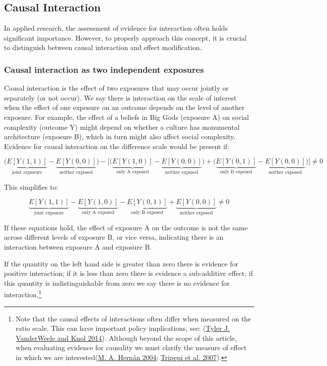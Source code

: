 \documentclass[
  singlecolumn]{report}
\begin{document}
\hypertarget{causal-interaction}{%
\subsection{Causal Interaction}\label{causal-interaction}}

In applied research, the assessment of evidence for interaction often
holds significant importance. However, to properly approach this
concept, it is crucial to distinguish between causal interaction and
effect modification.

\hypertarget{causal-interaction-as-two-independent-exposures}{%
\subsubsection{\texorpdfstring{\textbf{Causal interaction as two
independent
exposures}}{Causal interaction as two independent exposures}}\label{causal-interaction-as-two-independent-exposures}}

Causal interaction is the effect of two exposures that may occur jointly
or separately (or not occur). We say there is interaction on the scale
of interest when the effect of one exposure on an outcome depends on the
level of another exposure. For example, the effect of a beliefs in Big
Gods (exposure A) on social complexity (outcome Y) might depend on
whether a culture has monumental architecture (exposure B), which in
turn might also affect social complexity. Evidence for causal
interaction on the difference scale would be present if:

\[\bigg(\underbrace{E[Y(1,1)]}_{\text{joint exposure}} - \underbrace{E[Y(0,0)]}_{\text{neither exposed}}\bigg) - \bigg[ \bigg(\underbrace{E[Y(1,0)]}_{\text{only A exposed}} - \underbrace{E[Y(0,0)]}_{\text{neither exposed}}\bigg) + \bigg(\underbrace{E[Y(0,1)]}_{\text{only B exposed}} - \underbrace{E[Y(0,0)]}_{\text{neither exposed}} \bigg)\bigg] \neq 0 \]

This simplifies to:

\[ \underbrace{E[Y(1,1)]}_{\text{joint exposure}} - \underbrace{E[Y(1,0)]}_{\text{only A exposed}} - \underbrace{E[Y(0,1)]}_{\text{only B exposed}} + \underbrace{E[Y(0,0)]}_{\text{neither exposed}} \neq 0 \]

If these equations hold, the effect of exposure A on the outcome is not
the same across different levels of exposure B, or vice versa,
indicating there is an interaction between exposure A and exposure B.

If the quantity on the left hand side is greater than zero there is
evidence for positive interaction; if it is less than zero there is
evidence a sub-additive effect; if this quantity is indistinguishable
from zero we say there is no evidence for interaction.\footnote{Note
  that the causal effects of interactions often differ when measured on
  the ratio scale. This can have important policy implications, see:
  (\protect\hyperlink{ref-vanderweele2014}{Tyler J. VanderWeele and Knol
  2014}). Although beyond the scope of this article, when evaluating
  evidence for causality we must clarify the measure of effect in which
  we are interested(\protect\hyperlink{ref-hernuxe1n2004}{M. A. Hernán
  2004}; \protect\hyperlink{ref-tripepi2007}{Tripepi et al. 2007}).}
\end{document}
